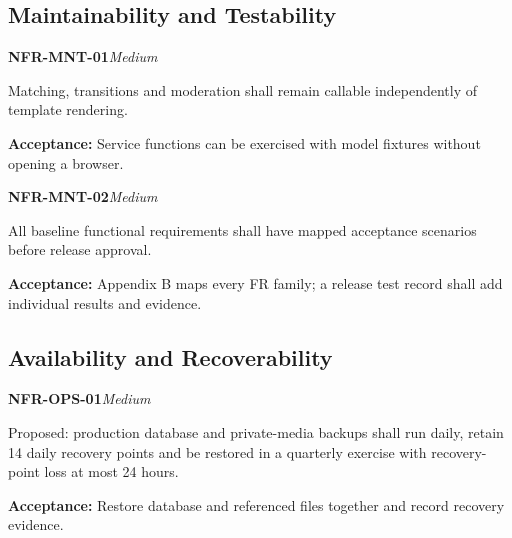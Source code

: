 \documentclass[12pt,a4paper,oneside]{report}
\begin{document}

\subsection{Maintainability and Testability}

\noindent\begin{minipage}{\linewidth}\textbf{NFR-MNT-01}\hfill\textit{Medium}\par\nopagebreak

Matching, transitions and moderation shall remain callable independently of template rendering.

{\color{muted}\textbf{Acceptance:} Service functions can be exercised with model fixtures without opening a browser.\par}\end{minipage}\par\vspace{5pt}

\noindent\begin{minipage}{\linewidth}\textbf{NFR-MNT-02}\hfill\textit{Medium}\par\nopagebreak

All baseline functional requirements shall have mapped acceptance scenarios before release approval.

{\color{muted}\textbf{Acceptance:} Appendix B maps every FR family; a release test record shall add individual results and evidence.\par}\end{minipage}\par\vspace{5pt}


\subsection{Availability and Recoverability}

\noindent\begin{minipage}{\linewidth}\textbf{NFR-OPS-01}\hfill\textit{Medium}\par\nopagebreak

Proposed: production database and private-media backups shall run daily, retain 14 daily recovery points and be restored in a quarterly exercise with recovery-point loss at most 24 hours.

{\color{muted}\textbf{Acceptance:} Restore database and referenced files together and record recovery evidence.\par}\end{minipage}\par\vspace{5pt}
\end{document}
